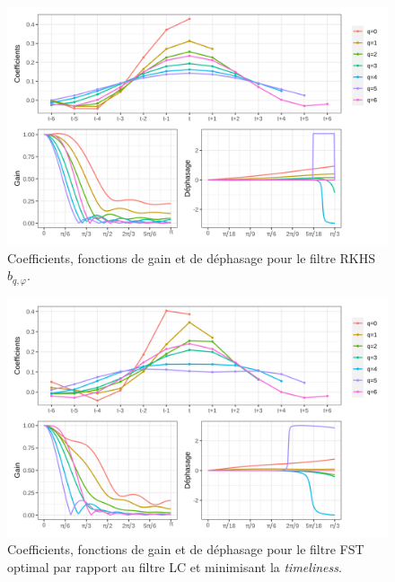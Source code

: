\documentclass[
  11pt,
  french,
  a4paper]{article}
\newcommand\1{\mathds{1}}
\begin{document}
\begin{figure}[H]

{\centering \includegraphics[width=1\linewidth]{img/filters_used/rkhs_timeliness} 

}

\caption[Coefficients, fonctions de gain et de déphasage pour le filtre RKHS \(b_{q,\varphi}\)]{Coefficients, fonctions de gain et de déphasage pour le filtre RKHS \(b_{q,\varphi}\).}\label{fig:graphsrkhs}

\footnotesize
\normalsize\end{figure}

\begin{figure}[H]

{\centering \includegraphics[width=1\linewidth]{img/filters_used/fst_lc} 

}

\caption[Coefficients, fonctions de gain et de déphasage pour le filtre FST optimal par rapport au filtre LC et minimisant la \emph{timeliness}]{Coefficients, fonctions de gain et de déphasage pour le filtre FST optimal par rapport au filtre LC et minimisant la \emph{timeliness}.}\label{fig:graphsfstlcmax}

\footnotesize
\normalsize\end{figure}
\end{document}
